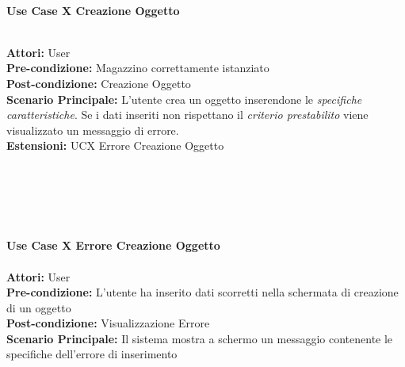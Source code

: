 \Large\textbf{}\\
\Large\textbf{Use Case X Creazione Oggetto} \\
\vspace{0.5cm}

\large\textbf{} \\
\textbf{Attori:} User\\
\textbf{Pre-condizione:} Magazzino correttamente istanziato \\
\textbf{Post-condizione: } Creazione Oggetto\\
\textbf{Scenario Principale:}  L'utente crea un oggetto inserendone le \textit{specifiche caratteristiche}. Se i dati inseriti non rispettano il \textit{criterio prestabilito} viene visualizzato un messaggio di errore.\\
\textbf{Estensioni: } UCX Errore Creazione Oggetto\\

\vspace{0.5cm}

\textbf{}\\
{} \\
{}\\

\vspace{0.5cm}

\Large\textbf{}\\
\Large\textbf{Use Case X Errore Creazione Oggetto} \\
\large\textbf{} \\
\textbf{Attori:} User\\
\textbf{Pre-condizione:} L'utente ha inserito dati scorretti nella schermata di creazione di un oggetto\\
\textbf{Post-condizione: } Visualizzazione Errore\\
\textbf{Scenario Principale:} Il sistema mostra a schermo un messaggio contenente le specifiche dell'errore di inserimento\\

